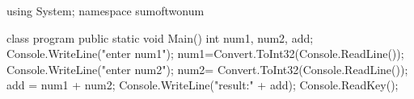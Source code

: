 using System;
namespace sumoftwonum
{
    class program
    {
        public static void Main()
        {
            int num1, num2, add;
            Console.WriteLine("enter num1");
            num1=Convert.ToInt32(Console.ReadLine());
            Console.WriteLine("enter num2");
            num2= Convert.ToInt32(Console.ReadLine());
            add = num1 + num2;
                Console.WriteLine("result:" + add);
            Console.ReadKey();
        }
    }

}